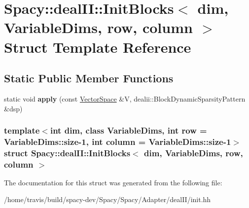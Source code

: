 \hypertarget{structSpacy_1_1dealII_1_1InitBlocks}{\section{\-Spacy\-:\-:deal\-I\-I\-:\-:\-Init\-Blocks$<$ dim, \-Variable\-Dims, row, column $>$ \-Struct \-Template \-Reference}
\label{structSpacy_1_1dealII_1_1InitBlocks}
}
\subsection*{\-Static \-Public \-Member \-Functions}
\begin{DoxyCompactItemize}
\item 
\hypertarget{structSpacy_1_1dealII_1_1InitBlocks_a3b94171837f4cad70dfb03a2543a8f92}{static void {\bfseries apply} (const \hyperlink{classSpacy_1_1VectorSpace}{\-Vector\-Space} \&\-V, dealii\-::\-Block\-Dynamic\-Sparsity\-Pattern \&dsp)}\label{structSpacy_1_1dealII_1_1InitBlocks_a3b94171837f4cad70dfb03a2543a8f92}

\end{DoxyCompactItemize}
\subsubsection*{template$<$int dim, class Variable\-Dims, int row = \-Variable\-Dims\-::size-\/1, int column = \-Variable\-Dims\-::size-\/1$>$ struct Spacy\-::deal\-I\-I\-::\-Init\-Blocks$<$ dim, Variable\-Dims, row, column $>$}



\-The documentation for this struct was generated from the following file\-:\begin{DoxyCompactItemize}
\item 
/home/travis/build/spacy-\/dev/\-Spacy/\-Spacy/\-Adapter/deal\-I\-I/init.\-hh\end{DoxyCompactItemize}
